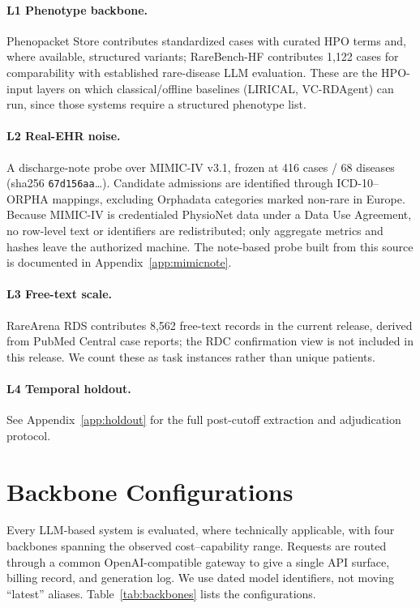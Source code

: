 \documentclass[letterpaper]{article} %
\begin{document}
\paragraph{L1 Phenotype backbone.}
Phenopacket Store contributes standardized cases with curated HPO terms and,
where available, structured variants; RareBench-HF contributes 1,122 cases for
comparability with established rare-disease LLM evaluation. These are the
HPO-input layers on which classical/offline baselines (LIRICAL, VC-RDAgent) can
run, since those systems require a structured phenotype list.

\paragraph{L2 Real-EHR noise.}
A discharge-note probe over MIMIC-IV v3.1, frozen at 416 cases /
68 diseases (sha256 \texttt{67d156aa}\ldots). Candidate admissions are identified
through ICD-10--ORPHA mappings, excluding Orphadata categories marked non-rare
in Europe. Because MIMIC-IV is credentialed PhysioNet data under a Data Use
Agreement, no row-level text or identifiers are redistributed; only aggregate
metrics and hashes leave the authorized machine. The note-based probe
built from this source is documented in Appendix~\ref{app:mimicnote}.

\paragraph{L3 Free-text scale.}
RareArena RDS contributes 8,562 free-text records in the current release,
derived from PubMed Central case reports; the RDC confirmation view is not
included in this release. We count these as task instances rather than unique
patients.

\paragraph{L4 Temporal holdout.}
See Appendix~\ref{app:holdout} for the full post-cutoff extraction and
adjudication protocol.

\section{Backbone Configurations}
\label{app:backbones}

Every LLM-based system is evaluated, where technically applicable, with four
backbones spanning the observed cost--capability range. Requests are routed
through a common OpenAI-compatible gateway to give a single API surface,
billing record, and generation log. We use dated model identifiers, not moving
``latest'' aliases. Table~\ref{tab:backbones} lists the configurations.
\end{document}
